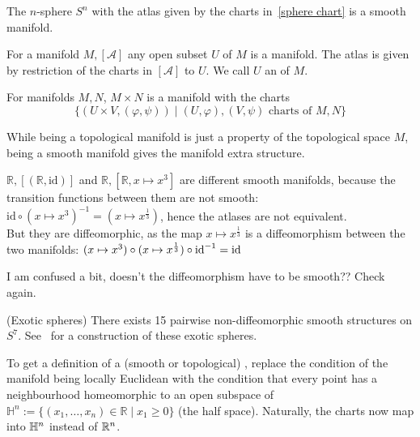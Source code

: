 \documentclass[a4paper,11pt]{article}
\begin{document}
\begin{example}[Spheres]
    The \(n\)-sphere \(S^n\) with the atlas given by the charts in\ \ref{sphere chart} is a smooth manifold.
\end{example}

\begin{example}
    For a manifold \(M,[\mathcal{A}]\) any open subset \(U\) of \(M\) is a manifold. 
    The atlas is given by restriction of the charts in \([\mathcal{A}]\) to \(U\). 
    We call \(U\) an  of \(M\).
\end{example}

\begin{example}
    For manifolds \(M,N\), \(M\times N\) is a manifold with the charts\[\{(U\times V,(\varphi,\psi))\mid(U,\varphi),(V,\psi)\text{ charts of }M,N\}\]
\end{example}

\begin{remark}
    While being a topological manifold is just a property of the topological space \(M\), being a smooth manifold gives the manifold extra structure.
\end{remark}

\begin{example}
    \(\mathbb{R},[(\mathbb{R},\mathrm{id})]\) and \(\mathbb{R},[\mathbb{R},x\mapsto x^3]\) are different smooth manifolds, because the transition functions between them are not smooth: 
    \(\mathrm{id}\circ(x\mapsto x^3)^{-1}=(x\mapsto x^{\frac13})\), hence the atlases are not equivalent.\\
    But they are diffeomorphic, as the map \(x\mapsto x^{\frac{1}{3}}\) is a diffeomorphism between the two manifolds: 
    \((x\mapsto x^3)\circ (x\mapsto x^{\frac13})\circ \mathrm{id}^{-1}= \mathrm{id}\)
\end{example}

I am confused a bit, doesn't the diffeomorphism have to be smooth?? Check again.

\begin{example}(Exotic spheres)
    There exists 15 pairwise non-diffeomorphic smooth structures on \(S^7\). See\ \cite{kervaire} for a construction of these exotic spheres.
\end{example}

\begin{definition}
    To get a definition of a (smooth or topological) , replace the condition of the manifold being locally Euclidean with the condition that every point has a neighbourhood homeomorphic to an open subspace of \(\mathbb{H}^n:=\{(x_1,\dots,x_n)\in\mathbb{R}\mid x_1\geq0\}\) (the half space). Naturally, the charts now map into \(\mathbb{H}^n\) instead of \(\mathbb{R}^n\).
\end{definition}
\end{document}
